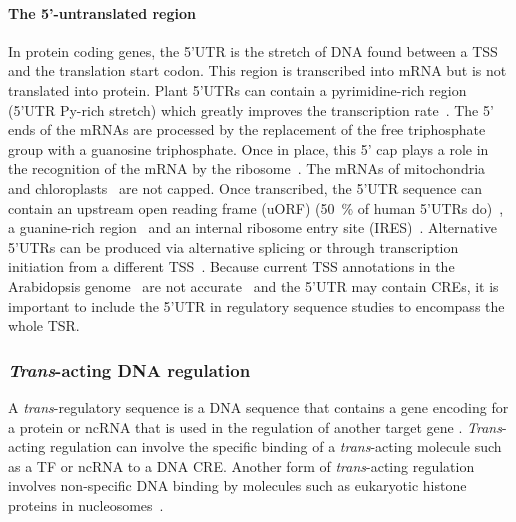 \documentclass[../main.tex]{subfiles}
\begin{document}
\paragraph{The 5'-untranslated region}\label{chapter1:the-5-untranslated-region}
In protein coding genes, the 5'UTR is the stretch of DNA found between a TSS and the translation start codon.
This region is transcribed into mRNA but is not translated into protein. Plant 5'UTRs can contain a pyrimidine\hyp{}rich region (5'UTR Py\hyp{}rich stretch) which greatly improves the transcription rate~\autocite{choudhuryComparativeStudyCultivar2009,duIsolationFunctionalCharacterization2010,bianCloningExpressionCharacterization2011}.
The 5' ends of the mRNAs are processed by the replacement of the free triphosphate group with a guanosine triphosphate.
Once in place, this 5' cap plays a role in the recognition of the mRNA by the ribosome~\autocite{byszewskaRNAMethyltransferasesInvolved2014,ramanathanMRNACappingBiological2016}.
The mRNAs of mitochondria~\autocite{temperleyHumanMitochondrialMRNAs2010} and chloroplasts~\autocite{mondeProcessingDegradationChloroplast2000} are not capped.
Once transcribed, the 5'UTR sequence can contain an upstream open reading frame (uORF) (\SI{50}{\percent} of human 5'UTRs do)~\autocite{calvoUpstreamOpenReading2009}, a guanine\hyp{}rich region~\autocite{beaudoinUTRGquadruplexStructures2010} and an internal ribosome entry site (IRES)~\autocite{jimenez-gonzalezFunctionalStructuralAnalysis2014}.
Alternative 5'UTRs can be produced via alternative splicing or through transcription initiation from a different TSS~\autocite{smithPosttranscriptionalRegulationGene2008}.
Because current TSS annotations in the Arabidopsis genome~\autocite{lameschArabidopsisInformationResource2012} are not accurate~\autocite{mortonPairedEndAnalysisTranscription2014,thieffryCharacterizationArabidopsisThaliana2020} and the 5'UTR may contain CREs, it is important to include the 5'UTR in regulatory sequence studies to encompass the whole TSR.

\subsubsection{\textit{Trans}-acting DNA regulation}\label{chapter1:trans-acting-dna-regulation}
A \textit{trans}\hyp{}regulatory sequence is a DNA sequence that contains a gene encoding for a protein or ncRNA that is used in the regulation of another target gene \autocite{watsonRecombinantDNAGenes2007}.
\textit{Trans}\hyp{}acting regulation can involve the specific binding of a \textit{trans}\hyp{}acting molecule such as a TF or ncRNA to a DNA CRE.
Another form of \textit{trans}\hyp{}acting regulation involves non\hyp{}specific DNA binding by molecules such as eukaryotic histone proteins in nucleosomes~\autocite{zhangIntrinsicHistoneDNAInteractions2009}.
\end{document}
